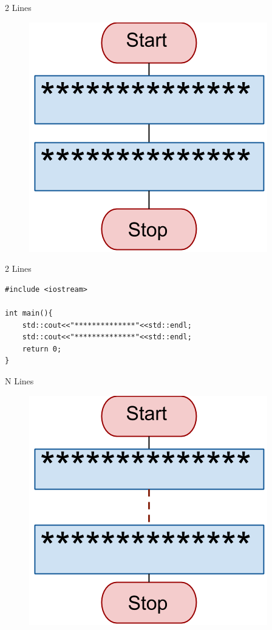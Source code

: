 \documentclass[xcolor={dvipsnames}]{beamer}
\begin{document}
\begin{frame}{2 Lines}
\begin{figure}
		\includegraphics[width=.8\textwidth]{two_lines}
	\end{figure}
\end{frame}

\begin{frame}[fragile]{2 Lines}
\Large
\begin{verbatim}
#include <iostream>

int main(){
    std::cout<<"**************"<<std::endl;
    std::cout<<"**************"<<std::endl;
    return 0;
}
\end{verbatim}
\end{frame}

\begin{frame}{N Lines}
\begin{figure}
		\includegraphics[width=.8\textwidth]{n_lines}
	\end{figure}
\end{frame}
\end{document}
